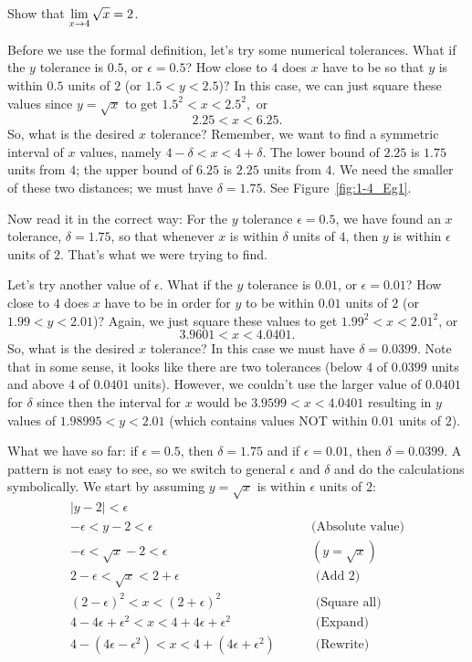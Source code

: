 \begin{example} \label{Ex:1.4.Eg1}
Show that $\displaystyle \lim_{x \to 4} \sqrt{x} = 2 $.

\solution Before we use the formal definition, let's try some numerical tolerances.  What if the $y$ tolerance is $0.5$, or $\epsilon =0.5$?  How close to $4$ does $x$ have to be so that $y$ is within $0.5$ units of $2$ (or $1.5 < y < 2.5$)?  In this case, we can just square these values since $y = \sqrt{x}$ to get
$1.5^2 < x < 2.5^2,$ or 
\[ 2.25 < x < 6.25.\]
So, what is the desired $x$ tolerance?  Remember, we want to find a symmetric interval of $x$ values, namely
$4 - \delta < x < 4 + \delta$.  The lower bound of $2.25$ is $1.75$ units from $4$; the upper bound of $6.25$ is $2.25$ units from $4$. We need the smaller of these two distances; we must have $\delta = 1.75$. See Figure~\ref{fig:1-4_Eg1}.

Now read it in the correct way:  For the $y$ tolerance $\epsilon =0.5$, we have found an $x$ tolerance, $\delta = 1.75$, so that whenever $x$ is within $\delta$ units of $4$, then $y$ is within $\epsilon$ units of $2$.  That's what we were trying to find.
  
Let's try another value of $\epsilon$.  What if the $y$ tolerance is $0.01$, or $\epsilon =0.01$?  How close to $4$ does $x$ have to be in order for $y$ to be within $0.01$ units of $2$ (or $1.99 < y < 2.01$)?  Again, we just square these values to get $1.99^2 < x < 2.01^2$, or 
\[ 3.9601 < x < 4.0401.\]  
So, what is the desired $x$ tolerance?  In this case we must have $\delta = 0.0399$.  Note that in some sense, it looks like there are two tolerances (below $4$ of $0.0399$ units and above $4$ of $0.0401$ units).  However, we couldn't use the larger value of $0.0401$ for $\delta$ since then the interval for $x$ would be  $3.9599 < x < 4.0401$ resulting in $y$ values of $1.98995 < y < 2.01$ (which contains values NOT within $0.01$ units of $2$).

What we have so far: if $\epsilon =0.5$, then $\delta = 1.75$ and if $\epsilon =0.01$, then $\delta = 0.0399$. A pattern is not easy to see, so we switch to general $\epsilon$ and $\delta$ and do the calculations symbolically.  We start by assuming $y=\sqrt{x}$ is within $\epsilon$ units of $2$:
\begin{eqnarray*}
|y - 2| < \epsilon &\\
-\epsilon < y - 2 < \epsilon& \qquad \textrm{(Absolute value)}\\
-\epsilon < \sqrt{x} - 2 < \epsilon  &\qquad (y=\sqrt{x})\\
2 - \epsilon < \sqrt{x} < 2+ \epsilon &\qquad \textrm{ (Add 2)}\\
(2 - \epsilon)^2 < x < (2+ \epsilon) ^2 &\qquad \textrm{ (Square all)}\\
4 - 4\epsilon + \epsilon^2 < x < 4 + 4\epsilon + \epsilon^2 &\qquad \textrm{ (Expand)}\\
4 - (4\epsilon - \epsilon^2) < x < 4 + (4\epsilon + \epsilon^2) &\qquad \textrm{ (Rewrite)}
\end{eqnarray*}


\end{example}
